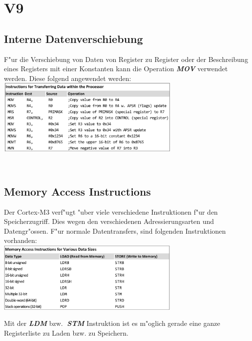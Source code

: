 \section{V9}
\begin{minipage}[t]{9cm}
	\subsection{Interne Datenverschiebung}
F"ur die Verschiebung von Daten von Register zu Register oder der Beschreibung eines Registers mit einer Konstanten kann die Operation \textbf{\textit{MOV} }verwendet werden. Diese folgend angewendet werden: \\

\includegraphics[width=9cm]{images/MOV-Instruktion}
\end{minipage}
%
\begin{minipage}[t]{0.5cm}
	\-\
\end{minipage}
%
\begin{minipage}[t]{9cm}
	\subsection{Memory Access Instructions}
Der Cortex-M3 verf"ugt "uber viele verschiedene Instruktionen f"ur den Speicherzugriff. Dies wegen den verschiedenen Adressierungsarten und Datengr"ossen. F"ur normale Datentransfers, sind folgenden Instruktionen vorhanden:\\

\includegraphics[width=9cm]{images/LDR-Instruktion}

Mit der \textbf{\textit{LDM}} bzw. \textbf{\textit{STM}} Instruktion ist es m"oglich gerade eine ganze Registerliste zu Laden bzw. zu Speichern.
\end{minipage}

